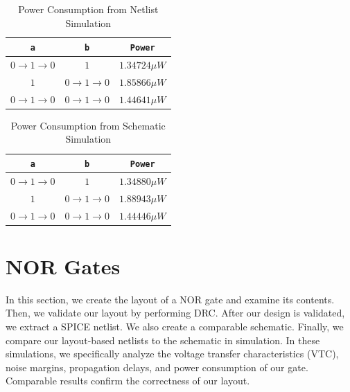 \documentclass{article}
\begin{document}
	\begin{table}[H]
	\begin{center}
	\caption{Power Consumption from Netlist Simulation}
	\label{table::nand_gate_power_analysis}
	\begin{tabular}{| c | c | c |}
		\hline
		\texttt{a} & \texttt{b} & \texttt{Power}\\
		\hline	
		$0 \rightarrow 1 \rightarrow 0$ & $1$ & $1.34724{\mu}W$ \\
		\hline	
		$1$ & $0 \rightarrow 1 \rightarrow 0$ & $1.85866{\mu}W$ \\
		\hline	
		$0 \rightarrow 1 \rightarrow 0$ & $0 \rightarrow 1 \rightarrow 0$ & $1.44641{\mu}W$\\
		\hline
	\end{tabular}
	\end{center}
	\end{table}
	
	\begin{table}[H]
	\begin{center}
	\caption{Power Consumption from Schematic Simulation}
	\label{table::nand_gate_power_analysis_schem}
	\begin{tabular}{| c | c | c |}
		\hline
		\texttt{a} & \texttt{b} & \texttt{Power}\\
		\hline	
		$0 \rightarrow 1 \rightarrow 0$ & $1$ & $1.34880{\mu}W$ \\
		\hline	
		$1$ & $0 \rightarrow 1 \rightarrow 0$ & $1.88943{\mu}W$ \\
		\hline	
		$0 \rightarrow 1 \rightarrow 0$ & $0 \rightarrow 1 \rightarrow 0$ & $1.44446{\mu}W$\\
		\hline
	\end{tabular}
	\end{center}
	\end{table}
	
	\section{NOR Gates}
	
	In this section, we create the layout of a NOR gate and examine its contents. Then, we validate our layout by performing DRC. After our design is validated, we extract a SPICE netlist. We also create a comparable schematic. Finally, we compare our layout-based netlists to the schematic in simulation. In these simulations, we specifically analyze the voltage transfer characteristics (VTC), noise margins, propagation delays, and power consumption of our gate. Comparable results confirm the correctness of our layout.
	
\end{document}
